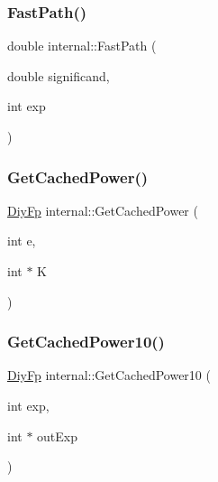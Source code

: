 \subsubsection{\texorpdfstring{Fast\+Path()}{FastPath()}}
{\footnotesize\ttfamily double internal\+::\+Fast\+Path (\begin{DoxyParamCaption}\item[{double}]{significand,  }\item[{int}]{exp }\end{DoxyParamCaption})\hspace{0.3cm}{\ttfamily [inline]}}

\mbox{\label{namespaceinternal_abac3dbfa1070756c37725829148f6038}} 
\subsubsection{\texorpdfstring{Get\+Cached\+Power()}{GetCachedPower()}}
{\footnotesize\ttfamily \hyperlink{structinternal_1_1DiyFp}{Diy\+Fp} internal\+::\+Get\+Cached\+Power (\begin{DoxyParamCaption}\item[{int}]{e,  }\item[{int $\ast$}]{K }\end{DoxyParamCaption})\hspace{0.3cm}{\ttfamily [inline]}}

\mbox{\label{namespaceinternal_a74b8503d044bf6c0a5e90c5bea3aba42}} 
\subsubsection{\texorpdfstring{Get\+Cached\+Power10()}{GetCachedPower10()}}
{\footnotesize\ttfamily \hyperlink{structinternal_1_1DiyFp}{Diy\+Fp} internal\+::\+Get\+Cached\+Power10 (\begin{DoxyParamCaption}\item[{int}]{exp,  }\item[{int $\ast$}]{out\+Exp }\end{DoxyParamCaption})\hspace{0.3cm}{\ttfamily [inline]}}

